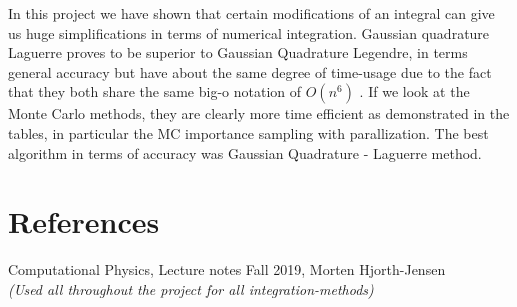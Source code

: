\documentclass{article}
\begin{document}
In this project we have shown that certain modifications of an integral can give us huge simplifications in terms of numerical integration. Gaussian quadrature Laguerre proves to be superior to Gaussian Quadrature Legendre, in terms general accuracy but have about the same degree of time-usage due to the fact that they both share the same big-o notation of $O(n^6)$ .  
If we look at the Monte Carlo methods, they are clearly more time efficient as demonstrated in the tables, in particular the MC importance sampling with parallization. The best algorithm in terms of accuracy was Gaussian Quadrature - Laguerre method. 

\section{References}
Computational Physics, Lecture notes Fall 2019, Morten Hjorth-Jensen \\ \textit{(Used all throughout the project for all integration-methods)}

\end{document}
